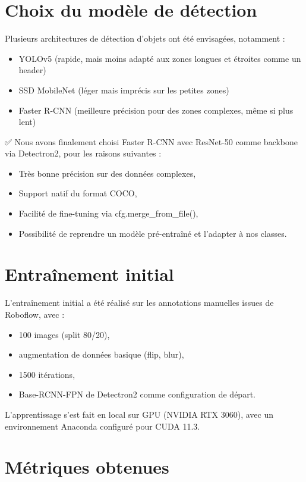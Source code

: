 \documentclass[12pt,a4paper]{report}
\begin{document}
\section{Choix du modèle de détection}

Plusieurs architectures de détection d'objets ont été envisagées, notamment :
\begin{itemize}
\item YOLOv5 (rapide, mais moins adapté aux zones longues et étroites comme un header)
\item SSD MobileNet (léger mais imprécis sur les petites zones)
\item Faster R-CNN (meilleure précision pour des zones complexes, même si plus lent)
\end{itemize}

✅ Nous avons finalement choisi Faster R-CNN avec ResNet-50 comme backbone via Detectron2, pour les raisons suivantes :
\begin{itemize}
\item Très bonne précision sur des données complexes,
\item Support natif du format COCO,
\item Facilité de fine-tuning via cfg.merge\_from\_file(),
\item Possibilité de reprendre un modèle pré-entraîné et l'adapter à nos classes.
\end{itemize}

\section{Entraînement initial}

L'entraînement initial a été réalisé sur les annotations manuelles issues de Roboflow, avec :
\begin{itemize}
\item 100 images (split 80/20),
\item augmentation de données basique (flip, blur),
\item 1500 itérations,
\item Base-RCNN-FPN de Detectron2 comme configuration de départ.
\end{itemize}

L'apprentissage s'est fait en local sur GPU (NVIDIA RTX 3060), avec un environnement Anaconda configuré pour CUDA 11.3.

\section{Métriques obtenues}
\end{document}
